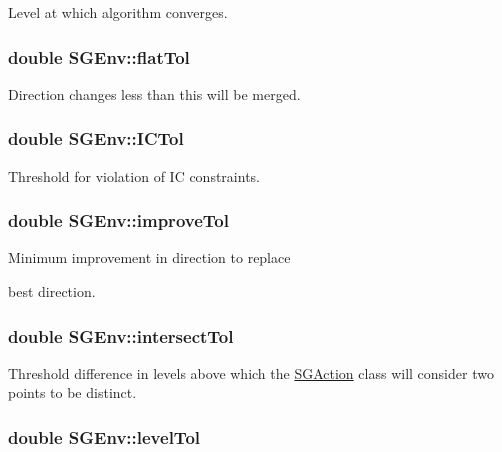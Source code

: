 Level at which algorithm converges. \hypertarget{classSGEnv_a45e50f610abb5155028317046f6bd2ec}{
\subsubsection[{flat\-Tol}]{\setlength{\rightskip}{0pt plus 5cm}double S\-G\-Env\-::flat\-Tol\hspace{0.3cm}{\ttfamily [private]}}}\label{classSGEnv_a45e50f610abb5155028317046f6bd2ec}
Direction changes less than this will be merged. \hypertarget{classSGEnv_afbb390530ed115e2478ef574ab2781c8}{
\subsubsection[{I\-C\-Tol}]{\setlength{\rightskip}{0pt plus 5cm}double S\-G\-Env\-::\-I\-C\-Tol\hspace{0.3cm}{\ttfamily [private]}}}\label{classSGEnv_afbb390530ed115e2478ef574ab2781c8}
Threshold for violation of I\-C constraints. \hypertarget{classSGEnv_af5c8453c8d759ea826b066b22bfa73fd}{
\subsubsection[{improve\-Tol}]{\setlength{\rightskip}{0pt plus 5cm}double S\-G\-Env\-::improve\-Tol\hspace{0.3cm}{\ttfamily [private]}}}\label{classSGEnv_af5c8453c8d759ea826b066b22bfa73fd}
\begin{DoxyVerb}       Minimum improvement in direction to replace
\end{DoxyVerb}
 best direction. \hypertarget{classSGEnv_a7ff6bedc734e8a7f2f24fc60cd9ba4e9}{
\subsubsection[{intersect\-Tol}]{\setlength{\rightskip}{0pt plus 5cm}double S\-G\-Env\-::intersect\-Tol\hspace{0.3cm}{\ttfamily [private]}}}\label{classSGEnv_a7ff6bedc734e8a7f2f24fc60cd9ba4e9}
Threshold difference in levels above which the \hyperlink{classSGAction}{S\-G\-Action} class will consider two points to be distinct. \hypertarget{classSGEnv_aafaa79c12a4d99238914ca3375d5fb1c}{
\subsubsection[{level\-Tol}]{\setlength{\rightskip}{0pt plus 5cm}double S\-G\-Env\-::level\-Tol\hspace{0.3cm}{\ttfamily [private]}}}\label{classSGEnv_aafaa79c12a4d99238914ca3375d5fb1c}
